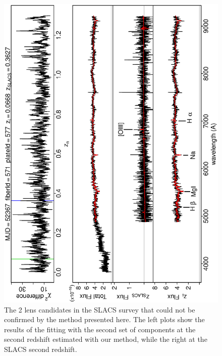\documentclass[12pt,preprint]{aastex}
\begin{document}
\begin{figure}
\includegraphics[angle=-90,width=0.49\columnwidth]{paper_plots/paper_66gg_zclose}
\caption{The 2 lens candidates in the SLACS survey that could not be confirmed by the
  method presented here. The left plots show the results of the
  fitting with the second set of components at the second redshift
  estimated with our method, while the right at the SLACS second
  redshift.}
\label{fig:9}
\end{figure}
\end{document}
